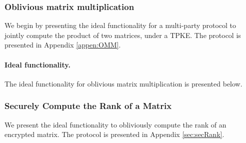 \subsubsection{Oblivious matrix multiplication}
\label{sec:secMult}
We begin by presenting the ideal functionality for a multi-party protocol to jointly compute the product of two matrices, under a TPKE. The protocol is presented in Appendix \ref{appen:OMM}.


\paragraph{Ideal functionality.} The ideal functionality for oblivious matrix multiplication is presented below.

\begin{center}
\end{center}



\subsubsection{Securely Compute the Rank of a Matrix}

We present the ideal functionality to obliviously compute the rank of an encrypted matrix. The protocol is presented in Appendix \ref{sec:secRank}.

